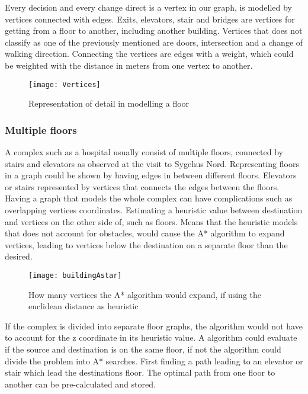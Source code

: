 Every decision and every change direct is a vertex in our graph, is modelled by vertices connected with edges. Exits, elevators, stair and bridges are vertices for getting from a floor to another, including another building. Vertices that does not classify as one of the previously mentioned are doors, intersection and a change of walking direction. Connecting the vertices are edges with a weight, which could be weighted with the distance in meters from one vertex to another.

\begin{figure}[ht!]
    \centering
    \texttt{[image: Vertices]}
    \caption{Representation of detail in modelling a floor}
    \label{fig:Vertices}
  \end{figure}

\subsubsection{Multiple floors}

A complex such as a hospital usually consist of multiple floors, connected by stairs and elevators as observed at the visit to Sygehus Nord. Representing floors in a graph could be shown by having edges in between different floors. Elevators or stairs represented by vertices that connects the edges between the floors. Having a graph that models the whole complex can have complications such as overlapping vertices coordinates. Estimating a heuristic value between destination and vertices on the other side of, such as floors. Means that the heuristic models that does not account for obstacles, would cause the A* algorithm to expand vertices, leading to vertices below the destination on a separate floor than the desired.

\begin{figure}[ht!]
    \centering
    \texttt{[image: buildingAstar]}
    \caption{How many vertices the A* algorithm would expand, if using the euclidean distance as heuristic}
    \label{fig:buildingAstar}
  \end{figure}

If the complex is divided into separate floor graphs, the algorithm would not have to account for the z coordinate in its heuristic value. A algorithm could evaluate if the source and destination is on the same floor, if not the algorithm could divide the problem into A* searches. First finding a path leading to an elevator or stair which lead the destinations floor. The optimal path from one floor to another can be pre-calculated and stored. 

